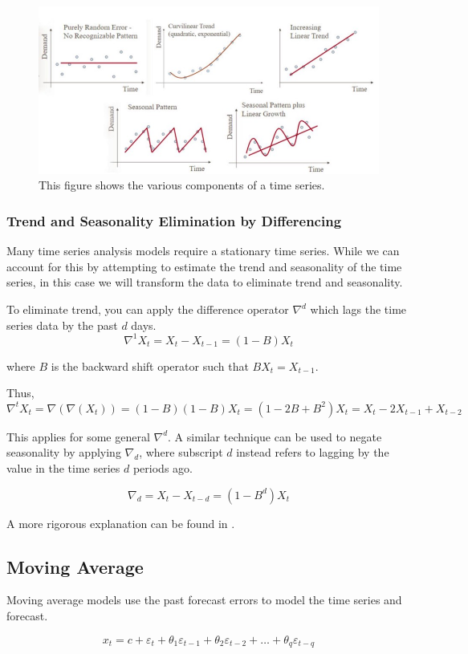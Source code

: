 \documentclass[12pt]{article}
\begin{document}
\begin{figure}[ht]
	\centering
	\includegraphics[width=.75\textwidth]{trend.jpeg}
	\caption{This figure shows the various components of a time series. \cite{trend}}
	\label{trends}
\end{figure}

\subsubsection{Trend and Seasonality Elimination by Differencing}
Many time series analysis models require a stationary time series. While we can account for this by attempting to estimate the trend and seasonality of the time series, in this case we will transform the data to eliminate trend and seasonality.

To eliminate trend, you can apply the difference operator $\nabla^d$ which lags the time series data by the past $d$ days.
$$\nabla^1 X_t = X_t - X_{t-1}=(1-B)X_t$$

where $B$ is the backward shift operator such that $BX_t = X_{t-1}$.

Thus, $$\nabla^t X_t = \nabla(\nabla(X_t)) = (1-B)(1-B)X_t = (1-2B+B^2)X_t = X_t-2X_{t-1}+X_{t-2}$$

This applies for some general $\nabla^d$. A similar technique can be used to negate seasonality by applying $\nabla_d$, where subscript $d$ instead refers to lagging by the value in the time series $d$ periods ago.

$$\nabla_d = X_t - X_{t-d} = (1-B^d) X_t$$

A more rigorous explanation can be found in \cite[22-32]{timeseries}.

\subsection{Moving Average}
Moving average models use the past forecast errors to model the time series and forecast. 

$$ x_{t} = c + \varepsilon_t + \theta_{1}\varepsilon_{t-1} + \theta_{2}\varepsilon_{t-2} + \dots + \theta_{q}\varepsilon_{t-q}$$
\end{document}

